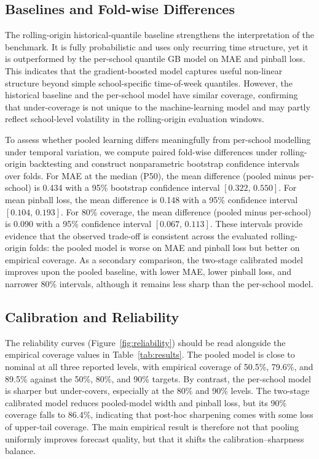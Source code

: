 \documentclass[12pt,a4paper]{article}
\begin{document}
\subsection{Baselines and Fold-wise Differences}

The rolling-origin historical-quantile baseline strengthens the interpretation of the benchmark. It is fully probabilistic and uses only recurring time structure, yet it is outperformed by the per-school quantile GB model on MAE and pinball loss. This indicates that the gradient-boosted model captures useful non-linear structure beyond simple school-specific time-of-week quantiles. However, the historical baseline and the per-school model have similar coverage, confirming that under-coverage is not unique to the machine-learning model and may partly reflect school-level volatility in the rolling-origin evaluation windows.

To assess whether pooled learning differs meaningfully from per-school modelling under temporal variation, we compute paired fold-wise differences under rolling-origin backtesting and construct nonparametric bootstrap confidence intervals over folds. For MAE at the median (P50), the mean difference (pooled minus per-school) is 0.434 with a 95\% bootstrap confidence interval $[0.322,\,0.550]$. For mean pinball loss, the mean difference is 0.148 with a 95\% confidence interval $[0.104,\,0.193]$. For 80\% coverage, the mean difference (pooled minus per-school) is 0.090 with a 95\% confidence interval $[0.067,\,0.113]$. These intervals provide evidence that the observed trade-off is consistent across the evaluated rolling-origin folds: the pooled model is worse on MAE and pinball loss but better on empirical coverage. As a secondary comparison, the two-stage calibrated model improves upon the pooled baseline, with lower MAE, lower pinball loss, and narrower 80\% intervals, although it remains less sharp than the per-school model.

\subsection{Calibration and Reliability}

The reliability curves (Figure~\ref{fig:reliability}) should be read alongside the empirical coverage values in Table~\ref{tab:results}. The pooled model is close to nominal at all three reported levels, with empirical coverage of 50.5\%, 79.6\%, and 89.5\% against the 50\%, 80\%, and 90\% targets. By contrast, the per-school model is sharper but under-covers, especially at the 80\% and 90\% levels. The two-stage calibrated model reduces pooled-model width and pinball loss, but its 90\% coverage falls to 86.4\%, indicating that post-hoc sharpening comes with some loss of upper-tail coverage. The main empirical result is therefore not that pooling uniformly improves forecast quality, but that it shifts the calibration--sharpness balance.
\end{document}
